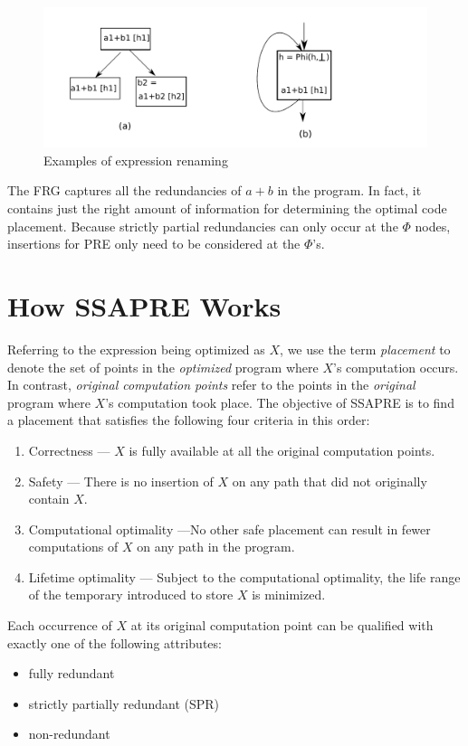 \begin{figure}
\centering
\includegraphics[scale=0.45]{fig-rename.pdf}
\caption{Examples of expression renaming}
\label{fig: rename}
\end{figure}
  
The FRG captures all the redundancies of $a+b$ in the program.  
In fact, it contains just the right
amount of information for determining the optimal code placement.  Because
strictly partial redundancies can only occur at the $\Phi$ nodes,
insertions for PRE only need to be considered at the $\Phi$'s.

\section{How SSAPRE Works}
\label{section:Part3:Pre_not_helped:SSAPRE}

Referring to the expression being optimized as $X$,
we use the term \emph{placement} to denote the set of points in the 
\emph{optimized} program where $X$'s computation occurs. In contrast,
\emph{original computation points} refer to the points in the \emph{original} 
program where $X$'s computation took place.  The objective of SSAPRE is to find
a placement that satisfies the following four criteria in this order:
\begin{enumerate}
\item Correctness --- $X$ is fully available at all the original computation
points.
\item Safety --- There is no insertion of $X$ on any path that did not 
originally contain $X$. 
\item Computational optimality ---No other safe placement can result in fewer 
computations of $X$ on any path in the program.
\item Lifetime optimality --- Subject to the computational optimality,
the life range of the temporary introduced to store $X$ is minimized.
\end{enumerate}

Each occurrence of $X$ at its original computation point can be qualified
with exactly one of the following attributes:
\begin{itemize}
\item fully redundant
\item strictly partially redundant (SPR)
\item non-redundant
\end{itemize}

